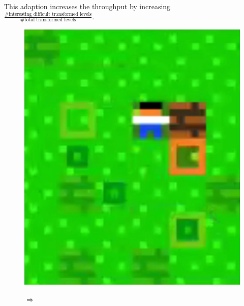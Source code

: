 \begin{description}
    This adaption increases the throughput by increasing $\frac{\text{\# interesting difficult transformed levels}}{\text{\# total transformed levels}}$.
        
\begin{figure}
\centering
\begin{minipage}[t]{0.3\textwidth}
\includegraphics[width=\textwidth]{figures/part3helpalittlefrom.png} \\
\end{minipage}
$\Longrightarrow$
\begin{minipage}[t]{0.3\textwidth}

\end{minipage}
\end{figure}
\end{description}
